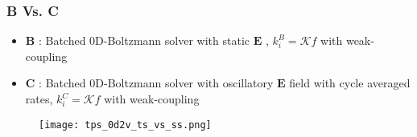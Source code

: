 \documentclass[mathserif, aspectratio=169]{beamer}
\newcommand{\vect}[1]{\boldsymbol{#1}}
\begin{document}
\begin{frame}
	\frametitle{B Vs. C}
	\begin{itemize}
		\item \textbf{B} : Batched 0D-Boltzmann solver with static $\vect{E}$ , $k_i^{B} = \mathcal{K}f$ with weak-coupling
		\item \textbf{C} : Batched 0D-Boltzmann solver with oscillatory $\vect{E}$ field with cycle averaged rates, $k_i^{C} = \mathcal{K}f$ with weak-coupling
	\end{itemize}
	\begin{figure}
		\begin{center}
			\texttt{[image: tps\_0d2v\_ts\_vs\_ss.png]}
		\end{center}
	\end{figure}
\end{frame}
\end{document}

